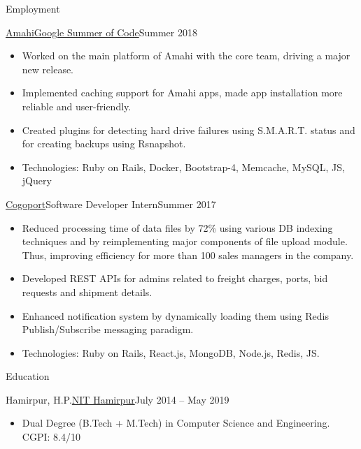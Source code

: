 \documentclass[]{mcdowellcv}
\begin{document}
	\makeheader
	
	\begin{cvsection}{Employment}
		\begin{cvsubsection}{\href {https://summerofcode.withgoogle.com/organizations/4708787353550848/}{Amahi}}{\href {https://summerofcode.withgoogle.com/}{Google Summer of Code}}{Summer 2018}
			\begin{itemize}
				\item Worked on the main platform of Amahi with the core team, driving a major new release.
				\item Implemented caching support for Amahi apps, made app installation more reliable and user-friendly.
				\item Created plugins for detecting hard drive failures using S.M.A.R.T. status and for creating backups using Rsnapshot.
				\item Technologies: Ruby on Rails, Docker, Bootstrap-4, Memcache, MySQL, JS, jQuery
			\end{itemize}
		\end{cvsubsection}
		\begin{cvsubsection}{\href {http://www.cogoport.com/}{Cogoport}}{Software Developer Intern}{Summer 2017}			
			\begin{itemize}
				\item Reduced processing time of data files by 72\% using various DB indexing techniques and by reimplementing major components of file upload module. Thus, improving efficiency for more than 100 sales managers in the company.
				\item Developed REST APIs for admins related to freight charges, ports, bid requests and shipment details. 
				\item Enhanced notification system by dynamically loading them using Redis Publish/Subscribe messaging paradigm.			
				\item Technologies: Ruby on Rails, React.js, MongoDB, Node.js, Redis, JS.
			\end{itemize}
		\end{cvsubsection}
	\end{cvsection}
	
	\begin{cvsection}{Education}
		\begin{cvsubsection}{Hamirpur, H.P.}{\href {http://nith.ac.in/}{NIT Hamirpur}}{July 2014 -- May 2019}
			\begin{itemize}
				\item Dual Degree (B.Tech + M.Tech) in Computer Science and Engineering. CGPI: 8.4/10
			\end{itemize}
		\end{cvsubsection}
	\end{cvsection}
	
\end{document}
